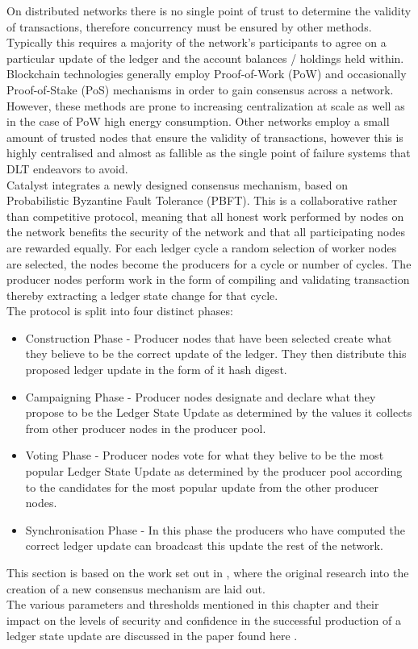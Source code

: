 On distributed networks there is no single point of trust to determine the validity of transactions, therefore concurrency must be ensured by other methods. Typically this requires a majority of the network's participants to agree on a particular update of the ledger and the account balances / holdings held within. Blockchain technologies generally employ Proof-of-Work (PoW) and occasionally Proof-of-Stake (PoS) mechanisms in order to gain consensus across a network. However, these methods are prone to increasing centralization at scale as well as in the case of PoW high energy consumption. Other networks employ a small amount of trusted nodes that ensure the validity of transactions, however this is highly centralised and almost as fallible as the single point of failure systems that DLT endeavors to avoid. \\

Catalyst integrates a newly designed consensus mechanism, based on Probabilistic Byzantine Fault Tolerance (PBFT).  This is a collaborative rather than competitive protocol, meaning that all honest work performed by nodes on the network benefits the security of the network and that all participating nodes are rewarded equally. For each ledger cycle a random selection of worker nodes are selected, the nodes become the producers for a cycle or number of cycles. The producer nodes perform work in the form of compiling and validating transaction thereby extracting a ledger state change for that cycle. \\


The protocol is split into four distinct phases:

\begin{itemize}

\item Construction Phase - Producer nodes that have been selected create what they believe to be the correct update of the ledger. They then distribute this proposed ledger update in the form of it hash digest.
\item Campaigning Phase - Producer nodes designate and declare what they propose to be the Ledger State Update as determined by the values it collects from other producer nodes in the producer pool.
\item Voting Phase - Producer nodes vote for what they belive to be the most popular Ledger State Update as determined by the producer pool according to the candidates for the most popular update from the other producer nodes.
\item Synchronisation Phase - In this phase the producers who have computed the correct ledger update can broadcast this update the rest of the network.

\end{itemize}

This section is based on the work set out in \cite{catalystresearch}, where the original research into the creation of a new consensus mechanism are laid out. \\

The various parameters and thresholds mentioned in this chapter and their impact on the levels of security and confidence in the successful production of a ledger state update are discussed in the paper found here \cite{catalystresearch2}.